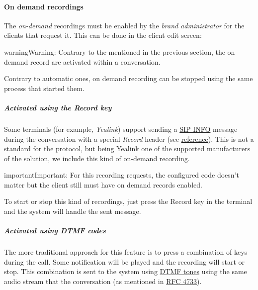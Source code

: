 \documentclass[letterpaper,10pt,english]{sphinxmanual}
\begin{document}
\paragraph{On demand recordings}
\label{administration_portal/client/retail/calls/call_recordings:on-demand-recordings}
The \emph{on-demand} recordings must be enabled by the \emph{brand administrator} for the
clients that request it. This can be done in the client edit screen:

\begin{notice}{warning}{Warning:}
Contrary to the {\hyperref[administration_portal/client/vpbx/services:services]{}} mentioned in the
previous section, the on demand record are activated within a conversation.
\end{notice}

Contrary to automatic ones, on demand recording can be stopped using the same
process that started them.


\subparagraph{Activated using the \emph{Record} key}
\label{administration_portal/client/retail/calls/call_recordings:activated-using-the-record-key}
Some terminals (for example, \emph{Yealink}) support sending a \href{https://tools.ietf.org/html/rfc6086}{SIP INFO} message during the conversation with a
special \emph{Record} header (see \href{http://www.yealink.com/Upload/document/UsingCallRecordingFeatureonYealinkPhones/UsingCallRecordingFeatureonYealinkSIPT2XPphonesRev\_610-20561729764.pdf}{reference}).
This is not a standard for the protocol, but being Yealink one of the supported
manufacturers of the solution, we include this kind of on-demand recording.

\begin{notice}{important}{Important:}
For this recording requests, the configured code doesn't matter
but the client still must have on demand records enabled.
\end{notice}

To start or stop this kind of recordings, just press the Record key in the
terminal and the system will handle the sent message.


\subparagraph{Activated using \emph{DTMF} codes}
\label{administration_portal/client/retail/calls/call_recordings:activated-using-dtmf-codes}
The more traditional approach for this feature is to press a combination of
keys during the call. Some notification will be played and the recording will
start or stop. This combination is sent to the system using \href{https://es.wikipedia.org/wiki/Marcaci\%C3\%B3n\_por\_tonos}{DTMF tones} using the same audio
stream that the conversation (as mentioned in \href{https://tools.ietf.org/html/rfc4733}{RFC 4733}).
\end{document}
